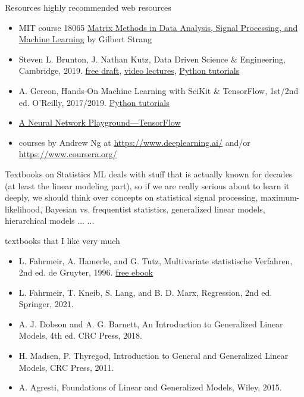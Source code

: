 \documentclass[mathserif, aspectratio=43]{intbeamer}
\begin{document}
\begin{frame}{Resources}
  highly recommended web resources
  \begin{itemize}
    \item MIT course 18065 \href{https://ocw.mit.edu/courses/18-065-matrix-methods-in-data-analysis-signal-processing-and-machine-learning-spring-2018/}{Matrix Methods in Data Analysis, Signal Processing, and Machine Learning} by Gilbert Strang
    \item Steven L. Brunton, J. Nathan Kutz, Data Driven Science \& Engineering, Cambridge, 2019.
    \href{http://www.databookuw.com/databook.pdf}{free draft},
    \href{http://www.databookuw.com/}{video lectures},
    \href{https://github.com/dylewsky/Data_Driven_Science_Python_Demos}{Python tutorials}
    \item A. Gereon, Hands-On Machine Learning with SciKit \& TensorFlow, 1st/2nd ed. O'Reilly, 2017/2019.
    \href{https://github.com/ageron/handson-ml2}{Python tutorials}
    \item \href{https://playground.tensorflow.org}{A Neural Network Playground---TensorFlow}
    \item courses by Andrew Ng at \url{https://www.deeplearning.ai/} and/or \url{https://www.coursera.org/}
  \end{itemize}
\end{frame}

\begin{frame}{Textbooks on Statistics}
    ML deals with stuff that is actually known for decades (at least the linear modeling part), so if we are really
    serious about to learn it deeply, we should think over concepts on
    statistical signal processing, maximum-likelihood, Bayesian vs. frequentist
    statistics, generalized linear models, hierarchical models ... ...

    textbooks that I like very much
  \begin{itemize}
  \item L. Fahrmeir, A. Hamerle, and G. Tutz, Multivariate statistische Verfahren, 2nd ed. de Gruyter, 1996.
  \href{https://www.degruyter.com/document/doi/10.1515/9783110816020/html}{free ebook}
  \item L. Fahrmeir, T. Kneib, S. Lang, and B. D. Marx, Regression, 2nd ed. Springer, 2021.
  \item A. J. Dobson and A. G. Barnett, An Introduction to Generalized Linear Models, 4th ed. CRC Press, 2018.
  \item H. Madsen, P. Thyregod, Introduction to General and Generalized Linear Models, CRC Press, 2011.
  \item A. Agresti, Foundations of Linear and Generalized Models, Wiley, 2015.
  \end{itemize}
\end{frame}
\end{document}

